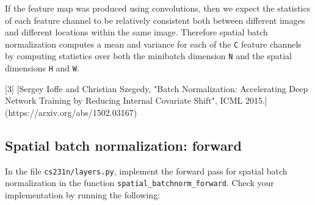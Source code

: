 \documentclass[11pt]{article}
\begin{document}
If the feature map was produced using convolutions, then we expect the
statistics of each feature channel to be relatively consistent both
between different images and different locations within the same image.
Therefore spatial batch normalization computes a mean and variance for
each of the \texttt{C} feature channels by computing statistics over
both the minibatch dimension \texttt{N} and the spatial dimensions
\texttt{H} and \texttt{W}.

{[}3{]} {[}Sergey Ioffe and Christian Szegedy, "Batch Normalization:
Accelerating Deep Network Training by Reducing Internal Covariate
Shift", ICML 2015.{]}(https://arxiv.org/abs/1502.03167)

    \subsection{Spatial batch normalization:
forward}\label{spatial-batch-normalization-forward}

In the file \texttt{cs231n/layers.py}, implement the forward pass for
spatial batch normalization in the function
\texttt{spatial\_batchnorm\_forward}. Check your implementation by
running the following:
\end{document}
